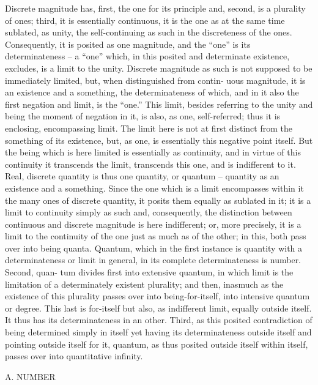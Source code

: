 Discrete magnitude has, first, the one for its principle and, second, is a
plurality of ones; third, it is essentially continuous, it is the one as at the
same time sublated, as unity, the self-continuing as such in the discreteness
of the ones. Consequently, it is posited as one magnitude, and the “one”
is its determinateness – a “one” which, in this posited and determinate
existence, excludes, is a limit to the unity. Discrete magnitude as such is not
supposed to be immediately limited, but, when distinguished from contin-
uous magnitude, it is an existence and a something, the determinateness
of which, and in it also the first negation and limit, is the “one.”
This limit, besides referring to the unity and being the moment of
negation in it, is also, as one, self-referred; thus it is enclosing, encompassing
limit. The limit here is not at first distinct from the something of its
existence, but, as one, is essentially this negative point itself. But the being
which is here limited is essentially as continuity, and in virtue of this
continuity it transcends the limit, transcends this one, and is indifferent to
it. Real, discrete quantity is thus one quantity, or quantum – quantity as
an existence and a something.
Since the one which is a limit encompasses within it the many ones
of discrete quantity, it posits them equally as sublated in it; it is a limit
to continuity simply as such and, consequently, the distinction between
continuous and discrete magnitude is here indifferent; or, more precisely,
it is a limit to the continuity of the one just as much as of the other; in this,
both pass over into being quanta.
Quantum, which in the first instance is quantity with a determinateness or
limit in general, in its complete determinateness is number. Second, quan-
tum divides first into extensive quantum, in which limit is the limitation of a
determinately existent plurality; and then, inasmuch as the existence of this
plurality passes over into being-for-itself, into intensive quantum or degree.
This last is for-itself but also, as indifferent limit, equally outside itself. It thus
has its determinateness in an other. Third, as this posited contradiction of
being determined simply in itself yet having its determinateness outside
itself and pointing outside itself for it, quantum, as thus posited outside
itself within itself, passes over into quantitative infinity.

A. NUMBER

